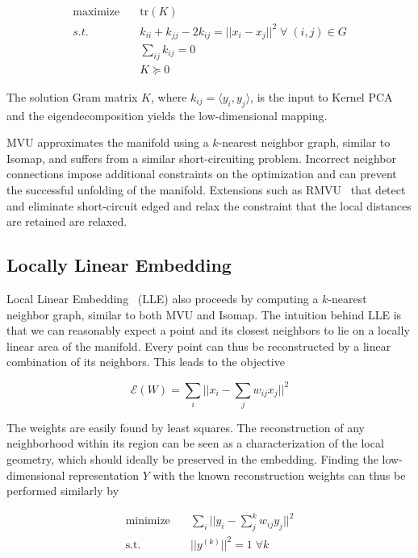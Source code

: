 \begin{align}
    \text{maximize} \quad & \text{tr}(K) \\
    s.t. \quad & k_{ii} + k_{jj} - 2k_{ij} = ||x_i - x_j||^2 \; \forall \; (i, j) \in G \nonumber \\
    & \sum_{ij} k_{ij} = 0 \nonumber \\
    & K \succeq 0 \nonumber
\end{align}

The solution Gram matrix $K$, where $k_{ij} = \langle y_i, y_j \rangle$, is the input to Kernel PCA and the
eigendecomposition yields the low-dimensional mapping.

MVU approximates the manifold using a $k$-nearest neighbor graph, similar to
Isomap, and suffers from a similar short-circuiting problem. Incorrect neighbor
connections impose additional constraints on the optimization and can prevent
the successful unfolding of the manifold. Extensions such as RMVU~\cite{rmvu}
that detect and eliminate short-circuit edged and relax the constraint that the
local distances are retained are relaxed.

\subsection{Locally Linear Embedding}

Local Linear Embedding~\cite{intro_lle, lle} (LLE) also proceeds by computing a $k$-nearest
neighbor graph, similar to both MVU and Isomap. The intuition behind LLE is that we can reasonably expect
a point and its closest neighbors to lie on a locally linear area of the manifold. Every point
can thus be reconstructed by a linear combination of its neighbors. This leads to the
objective

\begin{equation}
    \mathcal{E}(W) = \sum_i || x_i - \sum_j w_{ij}x_j ||^2
\end{equation}

The weights are easily found by least squares. The reconstruction of any neighborhood within
its region can be seen as a characterization of the local geometry, which should ideally be preserved
in the embedding. Finding the low-dimensional representation $Y$ with the known reconstruction weights can thus be performed
similarly by

\begin{align}
    \text{minimize} \quad & \sum_i || y_i - \sum_j^k w_{ij}y_j ||^2 \\
    \text{s.t.} \quad & || y^{(k)} ||^2 = 1 \; \forall k
\end{align}

